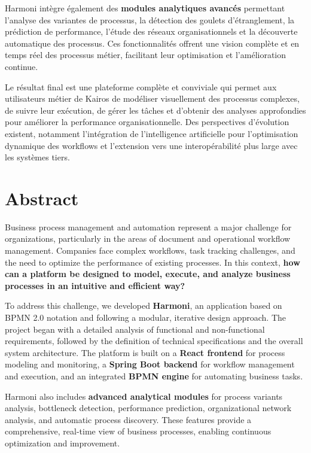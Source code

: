 \documentclass[12pt,a4paper,oneside]{extbook}
\begin{document}
Harmoni intègre également des \textbf{modules analytiques avancés} permettant l'analyse des variantes de processus, la détection des goulets d’étranglement, la prédiction de performance, l’étude des réseaux organisationnels et la découverte automatique des processus. Ces fonctionnalités offrent une vision complète et en temps réel des processus métier, facilitant leur optimisation et l'amélioration continue.  

Le résultat final est une plateforme complète et conviviale qui permet aux utilisateurs métier de Kairos de modéliser visuellement des processus complexes, de suivre leur exécution, de gérer les tâches et d’obtenir des analyses approfondies pour améliorer la performance organisationnelle. Des perspectives d’évolution existent, notamment l’intégration de l’intelligence artificielle pour l’optimisation dynamique des workflows et l’extension vers une interopérabilité plus large avec les systèmes tiers.



\textbf %
\newpage
\newpage
{}
\section*{Abstract}

Business process management and automation represent a major challenge for organizations, particularly in the areas of document and operational workflow management. Companies face complex workflows, task tracking challenges, and the need to optimize the performance of existing processes. In this context, \textbf{how can a platform be designed to model, execute, and analyze business processes in an intuitive and efficient way?}  

To address this challenge, we developed \textbf{Harmoni}, an application based on BPMN 2.0 notation and following a modular, iterative design approach. The project began with a detailed analysis of functional and non-functional requirements, followed by the definition of technical specifications and the overall system architecture. The platform is built on a \textbf{React frontend} for process modeling and monitoring, a \textbf{Spring Boot backend} for workflow management and execution, and an integrated \textbf{BPMN engine} for automating business tasks.  

Harmoni also includes \textbf{advanced analytical modules} for process variants analysis, bottleneck detection, performance prediction, organizational network analysis, and automatic process discovery. These features provide a comprehensive, real-time view of business processes, enabling continuous optimization and improvement.  
\end{document}
